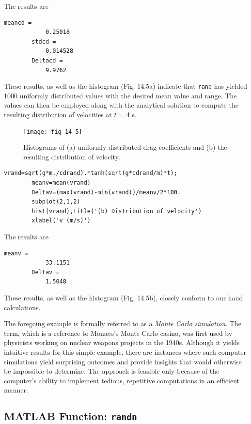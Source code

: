 \documentclass[../main.tex]{subfiles}
\begin{document}
\begin{example}
	\noindent The results are

	\begin{lstlisting}[numbers=none]
		meancd =
			0.25018
		stdcd =
			0.014528
		Deltacd =
			9.9762
	\end{lstlisting}

	\noindent These results, as well as the histogram (Fig. 14.5a) indicate that \texttt{rand} has yielded 1000
	uniformly distributed values with the desired mean value and range. The values can then be
	employed along with the analytical solution to compute the resulting distribution of velocities at $t$ = 4 s.

	\begin{figure}[H]
		\centering
		\texttt{[image: fig\_14\_5]}
		\caption{\textsf{Histograms of (a) uniformly distributed drag coefficients and (b) the resulting distribution of velocity.}}
		\label{fig:fig_14_5}
	\end{figure}

	\begin{lstlisting}[numbers=none]
		vrand=sqrt(g*m./cdrand).*tanh(sqrt(g*cdrand/m)*t);
		meanv=mean(vrand)
		Deltav=(max(vrand)-min(vrand))/meanv/2*100.
		subplot(2,1,2)
		hist(vrand),title('(b) Distribution of velocity')
		xlabel('v (m/s)')
	\end{lstlisting}

	\noindent The results are

	\begin{lstlisting}[numbers=none]
		meanv =
			33.1151
		Deltav =
			1.5048
	\end{lstlisting}

	\noindent These results, as well as the histogram (Fig. 14.5b), closely conform to our hand calculations.
\end{example}

The foregoing example is formally referred to as a \textit{Monte Carlo simulation}. The term,
which is a reference to Monaco's Monte Carlo casino, was first used by physicists working
on nuclear weapons projects in the 1940s. Although it yields intuitive results for this simple
example, there are instances where such computer simulations yield surprising outcomes
and provide insights that would otherwise be impossible to determine. The approach is feasible only because of the computer's ability to implement tedious, repetitive computations
in an efficient manner.

\label{cha:cha_P_14_2_2}
\subsection{MATLAB Function: \texttt{randn}}
\end{document}
